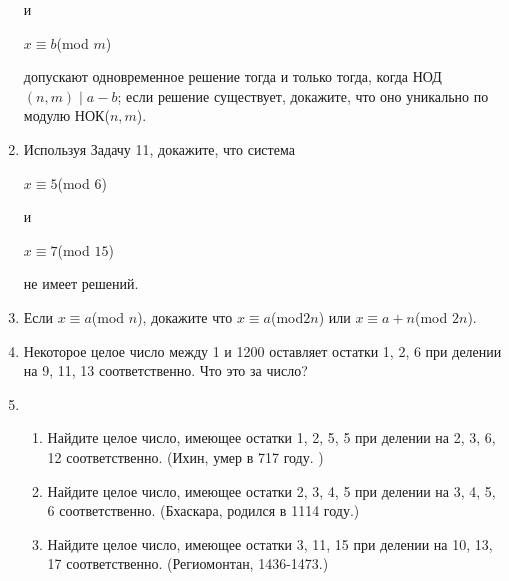 \documentclass[11pt]{article}
\begin{document}
\begin{enumerate}
\begin{center}
		и
	 	\begin{minipage}{0.2\textwidth}
	 		\begin{flushright}
	 			$x \equiv b$(mod $m$)	
	 		\end{flushright}
 		\end{minipage}	
	\end{center}
	допускают одновременное решение тогда и только тогда, когда НОД$(n,m)\mid a - b$; если решение
	существует, докажите, что оно уникально по модулю НОК($n,m$).
	\item Используя Задачу 11, докажите, что система
	\begin{center}
		\begin{minipage}{0.2\textwidth}
			\begin{flushleft}
				$x \equiv 5$(mod $6$)
			\end{flushleft}
		\end{minipage}
		и
		\begin{minipage}{0.2\textwidth}
			\begin{flushright}
				$x \equiv 7$(mod $15$)	
			\end{flushright}
		\end{minipage}	
	\end{center}
	не имеет решений.
	\item Если $x \equiv a$(mod $n$), докажите что $x \equiv a$(mod$2n$) или $x \equiv a + n$(mod $2n$).
	\item Некоторое целое число между 1 и 1200 оставляет остатки 1, 2, 6 при делении на 9, 11, 13 соответственно. Что это за число?
	\item 
		\begin{enumerate} 
		\item Найдите целое число, имеющее остатки 1, 2, 5, 5 при делении на 2, 3, 6, 12 соответственно. (Ихин, умер в 717 году. )
		\item Найдите целое число, имеющее остатки 2, 3, 4, 5 при делении на 3, 4, 5, 6 соответственно. (Бхаскара, родился в 1114 году.)
		\item Найдите целое число, имеющее остатки 3, 11, 15 при делении на 10, 13, 17 соответственно. (Региомонтан, 1436-1473.)	
		\end{enumerate} 
	\end{enumerate}	
\end{document}
